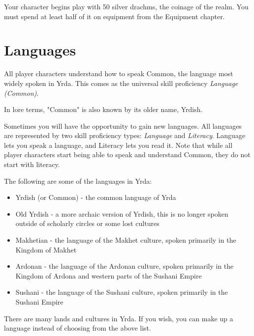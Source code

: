 \begin{multicols}{2}
Your character begins play with 50 silver drachms, the coinage of
the realm. You must spend at least half of it on equipment from the
Equipment chapter.

\section{Languages}

All player characters understand how to speak Common, the language most
widely spoken in Yrda. This comes as the universal skill proficiency
\textit{Language (Common)}.  

In lore terms, "Common" is also known by its older name, Yrdish.

Sometimes you will have the opportunity to gain new languages. All languages
are represented by two skill proficiency types: \textit{Language} and \textit{Literacy}.
Language lets you speak a language, and Literacy lets you read it. Note that
while all player characters start being able to speak and understand Common, they
do not start with literacy.

The following are some of the languages in Yrda:

\begin{itemize}
  \item Yrdish (or Common) - the common language of Yrda
  \item Old Yrdish - a more archaic version of Yrdish, this is no longer spoken
    outside of scholarly circles or some lost cultures
  \item Makhetian - the language of the Makhet culture, spoken primarily in the
    Kingdom of Makhet
  \item Ardonan - the language of the Ardonan culture, spoken primarily in the
    Kingdom of Ardona and western parts of the Sushani Empire
  \item Sushani - the language of the Sushani culture, spoken primarily in the
    Sushani Empire
\end{itemize}

There are many lands and cultures in Yrda. If you wish, you can make up a language
instead of choosing from the above list.

\end{multicols}
